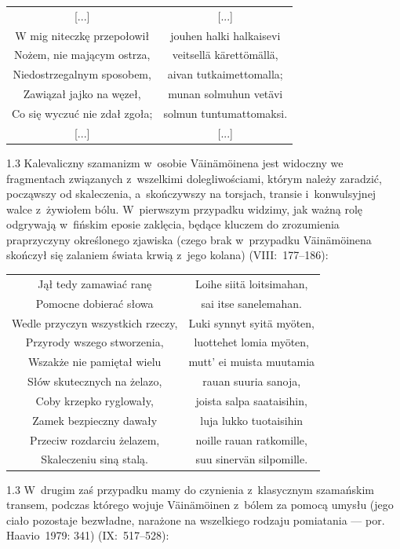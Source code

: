\documentclass[11pt,a4paper,twoside]{report}
\begin{document}
{\centering
\small
\begin{longtable}{c c}
{[...]} & {[...]}\\
W mig niteczkę przepołowił & jouhen halki halkaisevi\\
Nożem, nie mającym ostrza, & veitsellä kärettömällä,\\
Niedostrzegalnym sposobem, & aivan tutkaimettomalla;\\
Zawiązał jajko na węzeł, & munan solmuhun vetävi\\
Co się wyczuć nie zdał zgoła; & solmun tuntumattomaksi.\\
{[...]} & {[...]}\\
\end{longtable}
}
\begin{spacing}{1.3}
Kalevaliczny szamanizm w~osobie Väinämöinena jest widoczny we fragmentach związanych z~wszelkimi dolegliwościami, którym należy zaradzić, począwszy od skaleczenia, a~skończywszy na torsjach, transie i~konwulsyjnej walce z~żywiołem bólu. W~pierwszym przypadku widzimy, jak ważną rolę odgrywają w~fińskim eposie zaklęcia, będące kluczem do zrozumienia praprzyczyny określonego zjawiska (czego brak w~przypadku Väinämöinena skończył się zalaniem świata krwią z~jego kolana) (VIII:~177--186):
\end{spacing}
{\centering
\small
\begin{longtable}{c c}
Jął tedy zamawiać ranę    & Loihe siitä loitsimahan,\\
Pomocne dobierać słowa  & sai itse sanelemahan.\\
Wedle przyczyn wszystkich rzeczy, & Luki synnyt syitä myöten,\\
Przyrody wszego stworzenia, & luottehet lomia myöten,\\
Wszakże nie pamiętał wielu & mutt' ei muista muutamia\\
Słów skutecznych na żelazo, & rauan suuria sanoja,\\
Coby krzepko ryglowały, & joista salpa saataisihin,\\
Zamek bezpieczny dawały & luja lukko tuotaisihin\\
Przeciw rozdarciu żelazem, & noille rauan ratkomille,\\
Skaleczeniu siną stalą. & suu sinervän silpomille.\\
\end{longtable}
}
\begin{spacing}{1.3}
W~drugim zaś przypadku mamy do czynienia z~klasycznym szamańskim transem, podczas którego wojuje Väinämöinen z~bólem za pomocą umysłu (jego ciało pozostaje bezwładne, narażone na wszelkiego rodzaju pomiatania --- por. Haavio~1979: 341) (IX:~517--528):
\end{spacing}
\end{document}

